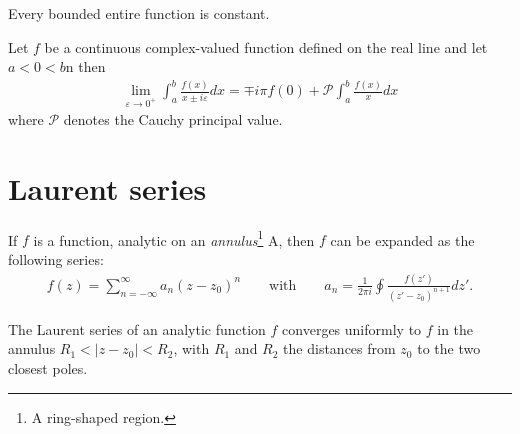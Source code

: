     \begin{theorem}[Liouville]
        Every bounded entire function is constant.
    \end{theorem}

    \begin{theorem}
        Let $f$ be a continuous complex-valued function defined on the real line and let $a<0<b$n then
        \begin{gather}
            \lim_{\varepsilon\rightarrow0^+}\int_a^b\frac{f(x)}{x\pm i\varepsilon}dx = \mp i\pi f(0) + \mathcal{P}\int_a^b\frac{f(x)}{x}dx
        \end{gather}
        where $\mathcal{P}$ denotes the Cauchy principal value.
    \end{theorem}

\section{Laurent series}

    \begin{definition}\label{complexcalculus:laurent_series}
        If $f$ is a function, analytic on an \textit{annulus}\footnote{A ring-shaped region.} A, then $f$ can be expanded as the following series:
        \begin{gather}
            f(z) = \sum^{\infty}_{n=-\infty} a_n (z - z_0)^n \qquad \text{with} \qquad a_n = \frac{1}{2\pi i} \oint \frac{f(z')}{(z' - z_0)^{n+1}} dz'.
        \end{gather}
    \end{definition}

    \begin{property}
        The Laurent series of an analytic function $f$ converges uniformly to $f$ in the annulus $R_1 < |z - z_0| < R_2$, with $R_1$ and $R_2$ the distances from $z_0$ to the two closest poles.
    \end{property}


